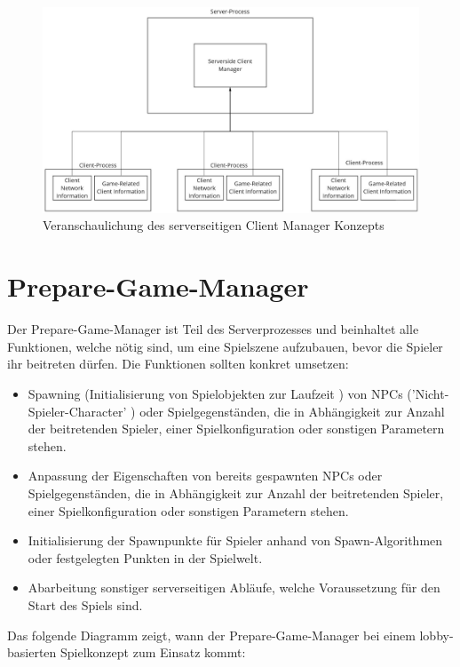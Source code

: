 \begin{figure}[H]
	\centering
	\includegraphics[width=120mm]{images/serversided_client_manager.jpg}
	\caption[Serversided Client Manager]{Veranschaulichung des serverseitigen Client Manager Konzepts}
	\label{pic:serversided_client_manager}
\end{figure}

\section{Prepare-Game-Manager}

Der Prepare-Game-Manager ist Teil des Serverprozesses und beinhaltet alle Funktionen, welche nötig sind, um eine Spielszene aufzubauen, bevor die Spieler ihr beitreten dürfen. Die Funktionen sollten konkret umsetzen:

\begin{itemize}
	\item Spawning (Initialisierung von Spielobjekten zur Laufzeit \cite{Wikipedia.2020}) von NPCs ('Nicht-Spieler-Character' \cite{.09.03.2022})  oder Spielgegenständen, die in Abhängigkeit zur Anzahl der beitretenden Spieler, einer Spielkonfiguration oder sonstigen Parametern stehen.
	\item Anpassung der Eigenschaften von bereits gespawnten NPCs oder Spielgegenständen, die in Abhängigkeit zur Anzahl der beitretenden Spieler, einer Spielkonfiguration oder sonstigen Parametern stehen.
	\item Initialisierung der Spawnpunkte für Spieler anhand von Spawn-Algorithmen oder festgelegten Punkten in der Spielwelt.
	\item Abarbeitung sonstiger serverseitigen Abläufe, welche Voraussetzung für den Start des Spiels sind.
\end{itemize}

Das folgende Diagramm zeigt, wann der Prepare-Game-Manager bei einem lobby-basierten Spielkonzept zum Einsatz kommt:

